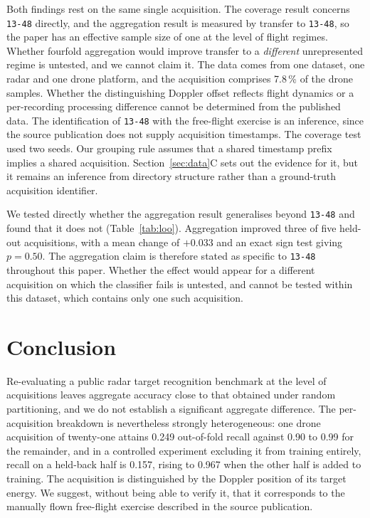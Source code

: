 \documentclass[conference]{IEEEtran}
\begin{document}
Both findings rest on the same single acquisition. The coverage result
concerns \texttt{13-48} directly, and the aggregation result is measured by
transfer to \texttt{13-48}, so the paper has an effective sample size of one
at the level of flight regimes. Whether fourfold aggregation would improve
transfer to a \emph{different} unrepresented regime is untested, and we
cannot claim it. The data comes from one dataset, one radar and one drone
platform, and the acquisition comprises 7.8\,\% of the drone samples. Whether the distinguishing Doppler offset reflects flight dynamics
or a per-recording processing difference cannot be determined from the
published data. The identification of \texttt{13-48} with the free-flight
exercise is an inference, since the source publication does not supply
acquisition timestamps. The coverage test used two seeds. Our grouping rule assumes that a shared timestamp prefix implies a shared
acquisition. Section~\ref{sec:data}C sets out the evidence for it, but it
remains an inference from directory structure rather than a ground-truth
acquisition identifier.

We tested directly whether the aggregation result generalises beyond
\texttt{13-48} and found that it does not
(Table~\ref{tab:loo}). Aggregation improved three of five held-out
acquisitions, with a mean change of $+0.033$ and an exact sign test giving
$p=0.50$. The aggregation claim is therefore stated as specific to
\texttt{13-48} throughout this paper. Whether the effect would appear for a
different acquisition on which the classifier fails is untested, and cannot
be tested within this dataset, which contains only one such acquisition.

\section{Conclusion}

Re-evaluating a public radar target recognition benchmark at the level of
acquisitions leaves aggregate accuracy close to that obtained under random
partitioning, and we do not establish a significant aggregate difference. The
per-acquisition breakdown is nevertheless strongly heterogeneous: one drone
acquisition of twenty-one attains 0.249 out-of-fold recall against 0.90 to
0.99 for the remainder, and in a controlled experiment excluding it from
training entirely, recall on a held-back half is 0.157, rising to 0.967 when
the other half is added to training. The acquisition is distinguished by the
Doppler position of its target energy. We suggest, without being able to
verify it, that it corresponds to the manually flown free-flight exercise
described in the source publication.
\end{document}
